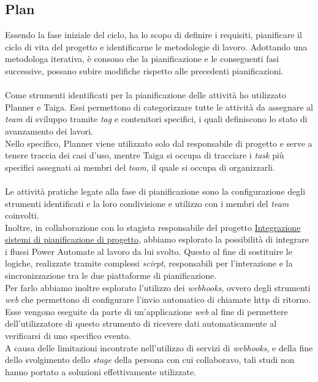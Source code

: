 \subsection{Plan}
Essendo la fase iniziale del ciclo, ha lo scopo di definire i requisiti, pianificare il ciclo di vita del progetto e identificarne le metodologie di lavoro.
Adottando una metodologa iterativa, è consono che la pianificazione e le conseguenti fasi successive, possano subire modifiche rispetto alle precedenti pianificazioni.\\\\
Come strumenti identificati per la pianificazione delle attività ho utilizzato Planner e Taiga.
Essi permettono di categorizzare tutte le attività da assegnare al \emph{team} di sviluppo tramite \emph{tag} e contenitori specifici, i quali definiscono lo stato di avanzamento dei lavori.\\
Nello specifico, Planner viene utilizzato solo dal responsabile di progetto e serve a tenere traccia dei casi d'uso, mentre Taiga si occupa di tracciare i \emph{task} più specifici assegnati ai membri del \emph{team}, il quale si occupa di organizzarli.\\\\
Le attività pratiche legate alla fase di pianificazione sono la configurazione degli strumenti identificati e la loro condivisione e utilizzo con i membri del \emph{team} coinvolti.\\
Inoltre, in collaborazione con lo stagista responsabile del progetto \hyperref[stageGiacomo]{Integrazione sistemi di pianificazione di progetto}, abbiamo esplorato la possibilità di integrare i flussi Power Automate al lavoro da lui svolto.
Questo al fine di sostituire le logiche, realizzate tramite complessi \emph{scirpt}, responsabili per l'interazione e la sincronizzazione tra le due piattaforme di pianificazione.\\
Per farlo abbiamo inoltre esplorato l'utilizzo dei \emph{webhooks}, ovvero degli strumenti \emph{web} che permettono di configurare l'invio automatico di chiamate \gls{http} di ritorno.
Esse vengono eseguite da parte di un'applicazione \emph{web} al fine di permettere dell'utilizzatore di questo strumento di ricevere dati automaticamente al verificarsi di uno specifico evento.\\
A causa delle limitazioni incontrate nell'utilizzo di servizi di \emph{webhooks}, e della fine dello svolgimento dello \emph{stage} della persona con cui collaboravo, tali studi non hanno portato a soluzioni effettivamente utilizzate.


